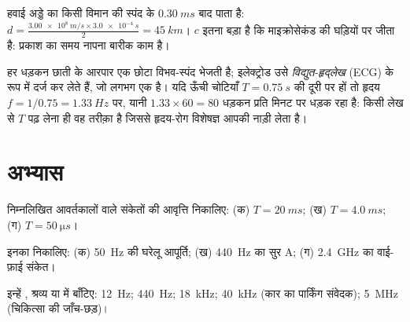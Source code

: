 \begin{example}[रडार]\label{ex:g10:signals-and-waves:radar}
हवाई अड्डे का  किसी विमान की  स्पंद के
$\qty{0.30}{ms}$ बाद पाता है: $d = \frac{\qty{3.00e8}{m/s} \times \qty{3.0e-4}{s}}{2} = \qty{45}{km}$। $c$ इतना बड़ा है कि 
माइक्रोसेकंड की घड़ियों पर जीता है: प्रकाश का समय नापना बारीक काम है।
\end{example}

\begin{example}[संकेत के रूप में हृदय]\label{ex:g10:signals-and-waves:ecg}
हर धड़कन छाती के आरपार एक छोटा विभव-स्पंद भेजती है; इलेक्ट्रोड उसे
\emph{विद्युत-हृद्लेख} (ECG) के रूप में दर्ज कर
लेते हैं, जो लगभग एक  है। यदि ऊँची चोटियाँ $T = \qty{0.75}{s}$
की दूरी पर हों तो हृदय $f = 1/0.75 = \qty{1.33}{Hz}$ पर, यानी $1.33 \times 60 = 80$ धड़कन प्रति मिनट पर
धड़क रहा है: किसी लेख से $T$ पढ़ लेना ही वह तरीक़ा है जिससे
हृदय-रोग विशेषज्ञ आपकी नाड़ी लेता है।
\end{example}

\section{अभ्यास}

\begin{exercise}[$\star$]\label{exo:g10:signals-and-waves:1}
निम्नलिखित आवर्तकालों वाले  संकेतों की आवृत्ति
निकालिए: (क) $T = \qty{20}{ms}$; (ख) $T = \qty{4.0}{ms}$; (ग) $T = \qty{50}{\micro s}$।
\end{exercise}

\begin{exercise}[$\star$]\label{exo:g10:signals-and-waves:2}
इनका  निकालिए: (क) \qty{50}{Hz} की घरेलू आपूर्ति; (ख)
\qty{440}{Hz} का सुर A; (ग) \qty{2.4}{GHz} का वाई-फ़ाई संकेत।
\end{exercise}

\begin{exercise}[$\star$]\label{exo:g10:signals-and-waves:3}
इन्हें , श्रव्य  या  में
बाँटिए: \qty{12}{Hz}; \qty{440}{Hz}; \qty{18}{kHz}; \qty{40}{kHz} (कार का पार्किंग संवेदक);
\qty{5}{MHz} (चिकित्सा की जाँच-छड़)।
\end{exercise}

